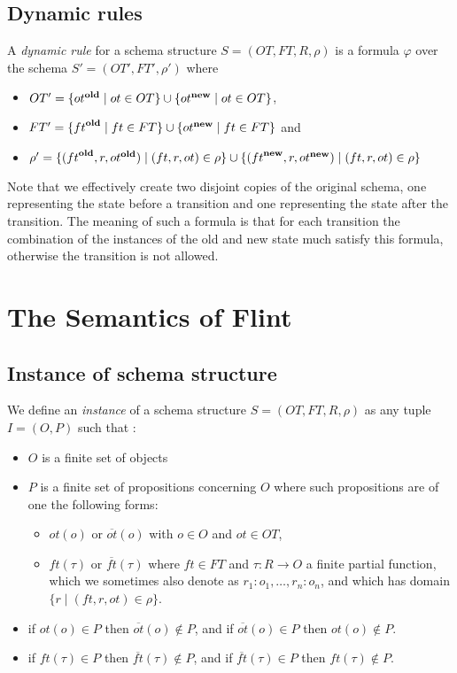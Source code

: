 \documentclass[11pt]{amsart}
\newcommand{\flint}{{\sc Flint}}
\newcommand{\old}[1]{{#1}^{\textrm{\textbf{old}}}}
\newcommand{\new}[1]{{#1}^{\textrm{\textbf{new}}}}
\begin{document}
\subsection{Dynamic rules}   A \emph{dynamic rule} for a schema structure $S = (OT, FT, R, \rho)$ is a formula $\varphi$ over the schema $S' = (OT', FT', \rho')$ where
\begin{itemize}
  \item $OT' = \{ \old{ot} \mid ot \in OT \} \cup \{ \new{ot} \mid ot \in OT  \}$, 
  \item $FT' = \{ \old{ft} \mid ft \in FT \} \cup \{ \new{ot} \mid ft \in FT  \}$ and 
  \item $\rho' = \{ (\old{ft}, r, \old{ot}) \mid (ft, r, ot) \in \rho \} \cup \{ (\new{ft}, r, \new{ot}) \mid (ft, r, ot) \in \rho \}$ 
\end{itemize}
Note that we effectively create two disjoint copies of the original schema, one representing the state before a transition and one representing the state after the transition. The meaning of such a formula is that for each transition the combination of the instances of the old and new state much satisfy this formula, otherwise the transition is not allowed.


\section{The Semantics of \flint}


\subsection{Instance of schema structure} We define an \emph{instance} of a schema structure $S = (OT, FT, R, \rho)$ as any tuple $I = (O, P)$ such that :
\begin{itemize}
  \item $O$ is a finite set of objects
  \item $P$ is a finite set of propositions concerning $O$ where such propositions are of one the following forms:
    \begin{itemize}
      \item $ot(o)$ or $\overline{ot}(o)$ with $o \in O$ and $ot \in OT$,
      \item $ft(\tau)$ or $\overline{ft}(\tau)$ where $ft \in FT$ and $\tau : R \to O$ a finite partial function, which we sometimes also denote as $r_1 : o_1, \ldots, r_n : o_n$, and which has domain $\{ r \mid (ft, r, ot) \in \rho \}$. 
    \end{itemize} 
  \item if $ot(o) \in P$ then $\overline{ot}(o) \not\in P$, and  if $\overline{ot}(o) \in P$ then ${ot}(o) \not\in P$.
  \item if $ft(\tau) \in P$ then $\overline{ft}(\tau) \not\in P$, and if $\overline{ft}(\tau) \in P$ then ${ft}(\tau) \not\in P$.  
\end{itemize}
\end{document}
